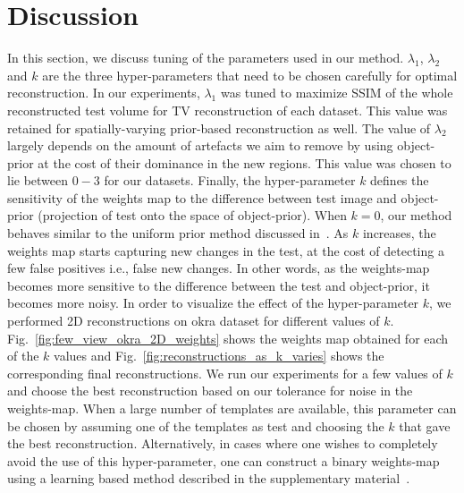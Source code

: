 \documentclass[journal]{IEEEtran}
\begin{document}
\section{Discussion}
\label{sec:discussion}
In this section, we discuss tuning of the parameters
used in our method. $\lambda_1$, $\lambda_2$ and $k$ are the three
hyper-parameters that need to be chosen carefully for optimal
reconstruction. In our experiments, $\lambda_1$ was tuned to maximize
SSIM of the whole reconstructed test volume for TV reconstruction of
each dataset. This value was retained for spatially-varying
prior-based reconstruction as well. The value of $\lambda_2$ largely
depends on the amount of artefacts we aim to remove by using
object-prior at the cost of their dominance in the new regions. This
value was chosen to lie between $0-3$ for our datasets. Finally, the
hyper-parameter $k$ defines the sensitivity of the weights map to the
difference between test image and object-prior (projection of
test onto the space of object-prior). When $k=0$, our method 
behaves similar to the uniform prior method discussed
in~\cite{my_dicta_paper}. As $k$ increases, the weights map starts
capturing new changes in the test, at the cost of detecting a few
false positives i.e., false new changes. In other words, as the
weights-map becomes more sensitive to the difference between the test
and object-prior, it becomes more noisy. In order to visualize the
effect of the hyper-parameter $k$, we performed 2D reconstructions on
okra dataset for different values of
$k$. Fig.~\ref{fig:few_view_okra_2D_weights} shows the weights map
obtained for each of the $k$ values and
Fig.~\ref{fig:reconstructions_as_k_varies} shows the corresponding
final reconstructions. We run our experiments for a few values of $k$
and choose the best reconstruction based on our tolerance for noise
in the weights-map.
When a large number of templates are available, this parameter can be
chosen by assuming one of the templates as test and choosing the $k$
that gave the best reconstruction. Alternatively, in cases where one
wishes to completely avoid the use of this hyper-parameter, one can
construct a binary weights-map using a learning based method described
in the supplementary material~\cite{supp_paper}.

\end{document}
